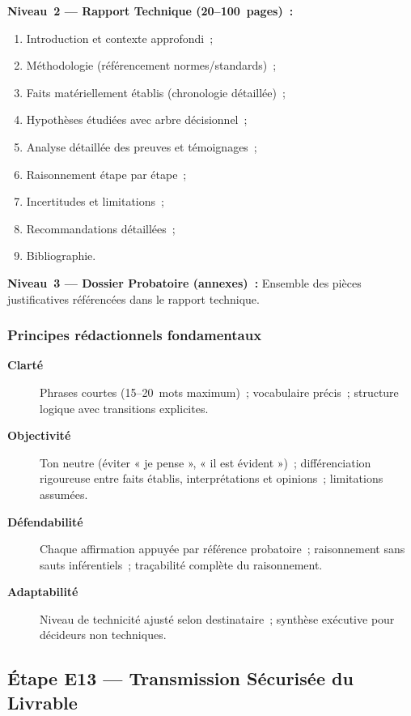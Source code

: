 \textbf{Niveau~2 --- Rapport Technique (20--100~pages)~:}
\begin{enumerate}
    \item Introduction et contexte approfondi~;
    \item Méthodologie (référencement normes/standards)~;
    \item Faits matériellement établis (chronologie détaillée)~;
    \item Hypothèses étudiées avec arbre décisionnel~;
    \item Analyse détaillée des preuves et témoignages~;
    \item Raisonnement étape par étape~;
    \item Incertitudes et limitations~;
    \item Recommandations détaillées~;
    \item Bibliographie.
\end{enumerate}

\textbf{Niveau~3 --- Dossier Probatoire (annexes)~:} Ensemble des pièces
justificatives référencées dans le rapport technique.

\subsubsection*{Principes rédactionnels fondamentaux}
\begin{description}
    \item[\textbf{Clarté}] Phrases courtes (15--20~mots maximum)~;
          vocabulaire précis~; structure logique avec transitions explicites.
    \item[\textbf{Objectivité}] Ton neutre (éviter « je pense »,
          « il est évident »)~; différenciation rigoureuse entre faits établis,
          interprétations et opinions~; limitations assumées.
    \item[\textbf{Défendabilité}] Chaque affirmation appuyée par référence
          probatoire~; raisonnement sans sauts inférentiels~;
          traçabilité complète du raisonnement.
    \item[\textbf{Adaptabilité}] Niveau de technicité ajusté selon
          destinataire~; synthèse exécutive pour décideurs non techniques.
\end{description}

\subsection{Étape E13 --- Transmission Sécurisée du Livrable}

